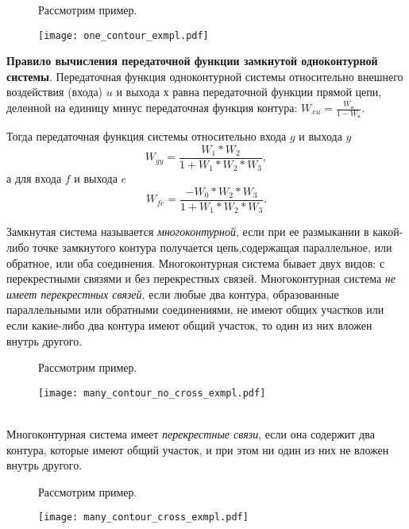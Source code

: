 \documentclass[../../TAU.tex]{subfiles}
\begin{document}
    \begin{figure}[h]
        \begin{minipage}[h]{0.29\linewidth}
            Рассмотрим пример.
            \vspace{3cm}
        \end{minipage}
        \begin{minipage}[h]{0.70\linewidth}
            \texttt{[image: one\_contour\_exmpl.pdf]}
        \end{minipage}
    \end{figure}

    {\bf Правило вычисления передаточной функции замкнутой одноконтурной системы}. 
    Передаточная функция одноконтурной системы относительно внешнего воздействия (входа) $u$ и выхода $х$ равна передаточной функции прямой цепи, деленной на единицу минус передаточная функция контура: $W_{xu}=\frac{W_\text{п}}{1-W_\text{к}}$.

    Тогда передаточная функция системы относительно входа $g$ и выхода $y$ 
    $$W_{gy}=\frac{W_1*W_2}{1+W_1*W_2*W_3},$$
    а для входа $f$ и выхода $e$ 
    $$W_{fe}=\frac{-W_0*W_2*W_3}{1+W_1*W_2*W_3}.$$

     Замкнутая система называется {\it многоконтурной}, если при ее размыкании в какой-либо точке замкнутого контура получается цепь,содержащая параллельное, или обратное, или оба соединения. Многоконтурная система бывает двух видов: с перекрестными связями и без перекрестных связей.
    Многоконтурная система {\it не имеет перекрестных связей}, если любые два контура, образованные параллельными или обратными соединениями, не имеют общих участков или если какие-либо два контура имеют общий участок, то один из них вложен внутрь другого.
    \begin{figure}[h]
        \begin{minipage}[h]{0.19\linewidth}
            Рассмотрим пример.
            \vspace{3cm}
        \end{minipage}
        \begin{minipage}[h]{0.80\linewidth}
            \texttt{[image: many\_contour\_no\_cross\_exmpl.pdf]}
        \end{minipage}
    \end{figure}\\
    Многоконтурная система имеет {\it перекрестные связи}, если она содержит два контура, которые имеют общий участок, и при этом ни один из них не вложен внутрь другого.
    \begin{figure}[h]
        \begin{minipage}[h]{0.19\linewidth}
            Рассмотрим пример.
            \vspace{3cm}
        \end{minipage}
        \begin{minipage}[h]{0.80\linewidth}
            \texttt{[image: many\_contour\_cross\_exmpl.pdf]}
        \end{minipage}
    \end{figure}
\end{document}
